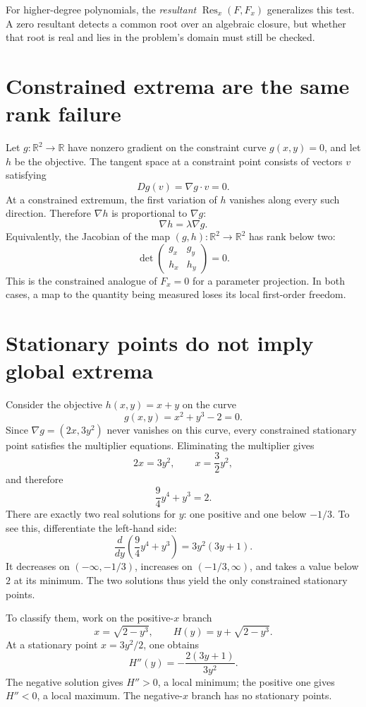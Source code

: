 For higher-degree polynomials, the \emph{resultant} \(\operatorname{Res}_x(F,F_x)\) generalizes this test. A zero resultant detects a common root over an algebraic closure, but whether that root is real and lies in the problem's domain must still be checked.

\section{Constrained extrema are the same rank failure}

Let \(g:\mathbb R^2\to\mathbb R\) have nonzero gradient on the constraint curve \(g(x,y)=0\), and let \(h\) be the objective. The tangent space at a constraint point consists of vectors \(v\) satisfying
\[
 Dg(v)=\nabla g\cdot v=0.
\]
At a constrained extremum, the first variation of \(h\) vanishes along every such direction. Therefore \(\nabla h\) is proportional to \(\nabla g\):
\[
 \nabla h=\lambda\nabla g.
\]
Equivalently, the Jacobian of the map \((g,h):\mathbb R^2\to\mathbb R^2\) has rank below two:
\[
 \det\begin{pmatrix}g_x&g_y\\h_x&h_y\end{pmatrix}=0.
\]
This is the constrained analogue of \(F_x=0\) for a parameter projection. In both cases, a map to the quantity being measured loses its local first-order freedom.

\section{Stationary points do not imply global extrema}

Consider the objective \(h(x,y)=x+y\) on the curve
\[
 g(x,y)=x^2+y^3-2=0.
\]
Since \(\nabla g=(2x,3y^2)\) never vanishes on this curve, every constrained stationary point satisfies the multiplier equations. Eliminating the multiplier gives
\[
 2x=3y^2,\qquad x=\frac32y^2,
\]
and therefore
\[
 \frac94y^4+y^3=2.
\]
There are exactly two real solutions for \(y\): one positive and one below \(-1/3\). To see this, differentiate the left-hand side:
\[
 \frac d{dy}\left(\frac94y^4+y^3\right)
   =3y^2(3y+1).
\]
It decreases on \((-\infty,-1/3)\), increases on \((-1/3,\infty)\), and takes a value below \(2\) at its minimum. The two solutions thus yield the only constrained stationary points.

To classify them, work on the positive-\(x\) branch
\[
 x=\sqrt{2-y^3},\qquad
 H(y)=y+\sqrt{2-y^3}.
\]
At a stationary point \(x=3y^2/2\), one obtains
\[
 H''(y)=-\frac{2(3y+1)}{3y^2}.
\]
The negative solution gives \(H''>0\), a local minimum; the positive one gives \(H''<0\), a local maximum. The negative-\(x\) branch has no stationary points.


